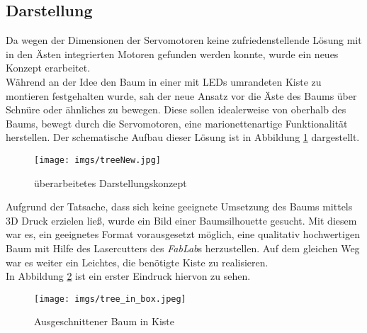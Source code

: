 \documentclass[.../Dokumentation.tex]{subfiles}
\begin{document}
\subsection{Darstellung}\label{sec-ita3-visualization}
Da wegen der Dimensionen der Servomotoren keine zufriedenstellende Lösung 
mit in den Ästen integrierten Motoren gefunden werden konnte, wurde ein neues 
Konzept erarbeitet.\\
Während an der Idee den Baum in einer mit LEDs umrandeten Kiste zu montieren 
festgehalten wurde, sah der neue Ansatz vor die Äste des Baums über Schnüre 
oder ähnliches zu bewegen.
Diese sollen idealerweise von oberhalb des Baums, bewegt durch die Servomotoren, 
eine marionettenartige Funktionalität herstellen.
Der schematische Aufbau dieser Lösung ist in Abbildung \ref{fig-treeNew} 
dargestellt.
\begin{figure}[H]
\begin{center}
    \texttt{[image: imgs/treeNew.jpg]}
    \caption{überarbeitetes Darstellungskonzept}
    \label{fig-treeNew}
\end{center}
\end{figure}
\noindent
Aufgrund der Tatsache, dass sich keine geeignete Umsetzung des Baums  
mittels 3D Druck erzielen ließ, wurde ein Bild einer Baumsilhouette gesucht.
Mit diesem war es, ein geeignetes Format vorausgesetzt möglich, eine qualitativ 
hochwertigen Baum mit Hilfe des Lasercutters des \textit{FabLab}s herzustellen.
Auf dem gleichen Weg war es weiter ein Leichtes, die benötigte Kiste zu 
realisieren.\\
In Abbildung \ref{fig-tree-in-box} ist ein erster Eindruck hiervon zu sehen.
\begin{figure}[H]
\begin{center}
    \texttt{[image: imgs/tree\_in\_box.jpeg]}
    \caption{Ausgeschnittener Baum in Kiste}
    \label{fig-tree-in-box}
\end{center}
\end{figure}
\end{document}
